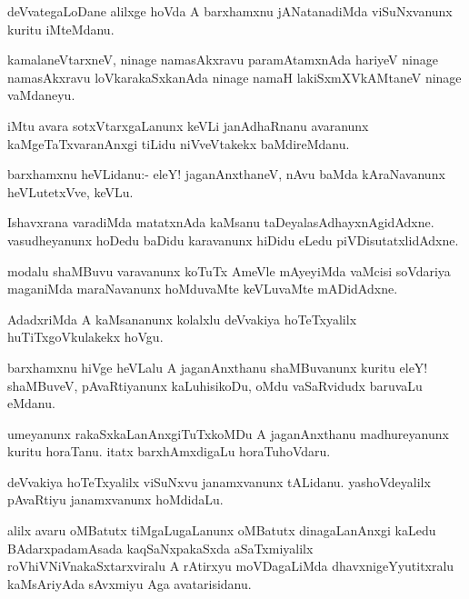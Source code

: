 \begin{mng}
deVvategaLoDane alilxge hoVda A barxhamxnu jANatanadiMda viSuNxvanunx kuritu iMteMdanu.
\end{mng}

\begin{mng}
kamalaneVtarxneV, ninage namasAkxravu paramAtamxnAda hariyeV ninage namasAkxravu loVkarakaSxkanAda ninage namaH lakiSxmXVkAMtaneV ninage vaMdaneyu.
\end{mng}

\begin{mng}
iMtu avara sotxVtarxgaLanunx keVLi janAdhaRnanu avaranunx kaMgeTaTxvaranAnxgi tiLidu niVveVtakekx baMdireMdanu.
\end{mng}

\begin{mng}
barxhamxnu heVLidanu:- eleY! jaganAnxthaneV, nAvu baMda kAraNavanunx heVLutetxVve, keVLu.
\end{mng}

\begin{mng}
Ishavxrana varadiMda matatxnAda kaMsanu taDeyalasAdhayxnAgidAdxne. vasudheyanunx hoDedu baDidu karavanunx hiDidu eLedu piVDisutatxlidAdxne.
\end{mng}

\begin{mng}
modalu shaMBuvu varavanunx koTuTx AmeVle mAyeyiMda vaMcisi soVdariya maganiMda maraNavanunx hoMduvaMte keVLuvaMte mADidAdxne.
\end{mng}

\begin{mng}
AdadxriMda A kaMsananunx kolalxlu deVvakiya hoTeTxyalilx huTiTxgoVkulakekx hoVgu.
\end{mng}

\begin{mng}
barxhamxnu hiVge heVLalu A jaganAnxthanu shaMBuvanunx kuritu eleY! shaMBuveV, pAvaRtiyanunx kaLuhisikoDu, oMdu vaSaRvidudx baruvaLu eMdanu.
\end{mng}

\begin{mng}
umeyanunx rakaSxkaLanAnxgiTuTxkoMDu A jaganAnxthanu madhureyanunx kuritu horaTanu. itatx barxhAmxdigaLu horaTuhoVdaru.
\end{mng}

\begin{mng}
deVvakiya hoTeTxyalilx viSuNxvu janamxvanunx tALidanu. yashoVdeyalilx pAvaRtiyu janamxvanunx hoMdidaLu.
\end{mng}

\begin{mng}
alilx avaru oMBatutx tiMgaLugaLanunx oMBatutx dinagaLanAnxgi kaLedu BAdarxpadamAsada kaqSaNxpakaSxda aSaTxmiyalilx roVhiVNiVnakaSxtarxviralu A rAtirxyu moVDagaLiMda dhavxnigeYyutitxralu kaMsAriyAda sAvxmiyu Aga avatarisidanu.
\end{mng}

